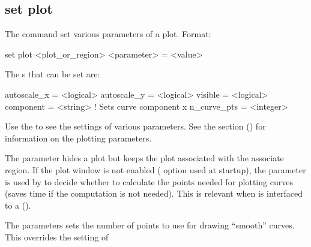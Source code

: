 {{%

\subsection{set plot}
\label{s:set.plot}

The  command set various parameters of a plot. Format:
\begin{example}
  set plot <plot_or_region> <parameter> = <value>
\end{example}

The s that can be set are:
\begin{example}
  autoscale_x        = <logical>
  autoscale_y        = <logical>
  visible            = <logical>
  component          = <string>    ! Sets curve component 
  x%
  n_curve_pts        = <integer>
\end{example}
Use the  to see the settings of various parameters. See the  section () for information on the plotting parameters.

The  parameter hides a plot but keeps the plot associated with the associate region. If
the plot window is not enabled ( option used at startup), the  parameter is
used by \tao to decide whether to calculate the points needed for plotting curves (saves time if the
computation is not needed). This is relevant when \tao is interfaced to a 
().

The  parameters sets the number of points to use for drawing ``smooth'' curves. This
overrides the setting of \vn{plot_page%
intermediate calculations used to compute a smooth curve to use in the computation of other smooth
curves. \tao will only do this for curves that have \vn{plot_page%
points. Depending upon the circumstances, setting \vn{plot%
slow down plotting calculations significantly.

Note: If the \vn{component} parameter is set, the \vn{<value>} is stored in each of the curves of
the plot since the \vn{component} attribute is associated with individual curves and not the plot as
a whole.

If \vn{<plot_or_region>} is a plot name, and there are visible plots of that name, any template plot
of the same name is ignored. To set a template plot in this case, add a ``\vn{T::}'' prefix.

}}}}}
